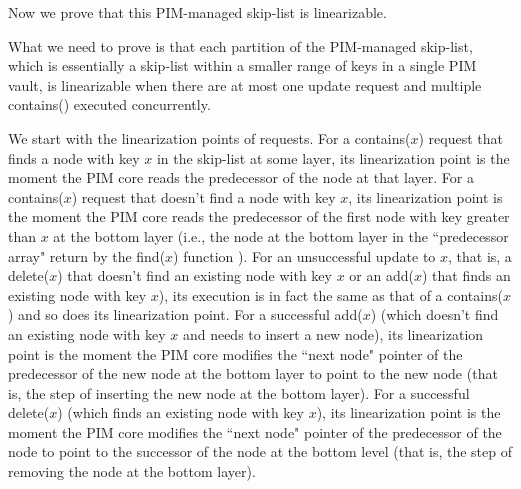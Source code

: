 \documentclass[11pt]{article}
\begin{document}
Now we prove that this PIM-managed skip-list is linearizable. 

\proof
What we need to prove is that each partition of the PIM-managed skip-list, 
which is essentially a skip-list within a smaller range of keys in a single PIM vault, 
is linearizable when there are at most one update request and multiple contains() executed concurrently.   

We start with the linearization points of requests. 
For a contains($x$) request that finds a node with key $x$ in the skip-list at some layer, 
its linearization point is the moment the PIM core reads the predecessor of the node at that layer. 
For a contains($x$) request that doesn't find a node with key $x$, its linearization point is the moment 
the PIM core reads the predecessor of the first node with key greater than $x$ at the bottom layer 
(i.e., the node at the bottom layer in the ``predecessor array" return by the find($x$) function \cite{Herlihy08}). 
For an unsuccessful update to $x$, that is, a delete($x$) that doesn't find an existing node with key $x$ 
or an add($x$) that finds an existing node with key $x$), 
its execution is in fact the same as that of a contains($x$) and so does its linearization point. 
For a successful add($x$) (which doesn't find an existing node with key $x$ and needs to insert a new node), 
its linearization point is the moment the PIM core modifies the ``next node" pointer of the predecessor 
of the new node at the bottom layer to point to the new node 
(that is, the step of inserting the new node at the bottom layer).  
For a successful delete($x$) (which finds an existing node with key $x$), its linearization point is 
the moment the PIM core modifies the ``next node" pointer of the predecessor of the node to point to 
the successor of the node at the bottom level (that is, the step of removing the node at the bottom layer). 
\end{document}
